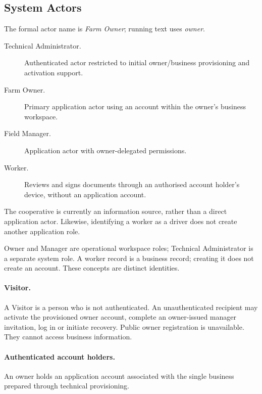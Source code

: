 \subsection{System Actors}

The formal actor name is \textit{Farm Owner}; running text uses
\textit{owner}.

\begin{description}

    \item[Technical Administrator.]
    Authenticated actor restricted to initial owner/business provisioning and activation support.

    \item[Farm Owner.]
    Primary application actor using an account within the owner's business workspace.

    \item[Field Manager.]
    Application actor with owner-delegated permissions.

    \item[Worker.]
    Reviews and signs documents through an authorised account holder's device,
    without an application account.

\end{description}

The cooperative is currently an information source,
rather than a direct application actor.
Likewise, identifying a worker as a driver
does not create another application role.

Owner and Manager are operational workspace roles; Technical Administrator is a separate system role.
A worker record is a business record; creating it does not create an account.
These concepts are distinct identities.

\paragraph{Visitor.}

A Visitor is a person who is not authenticated.
An unauthenticated recipient may activate the provisioned owner account, complete
an owner-issued manager invitation, log in or initiate recovery. Public owner
registration is unavailable.
They cannot access business information.

\paragraph{Authenticated account holders.}

An owner holds an application account associated with
the single business prepared through technical provisioning.

